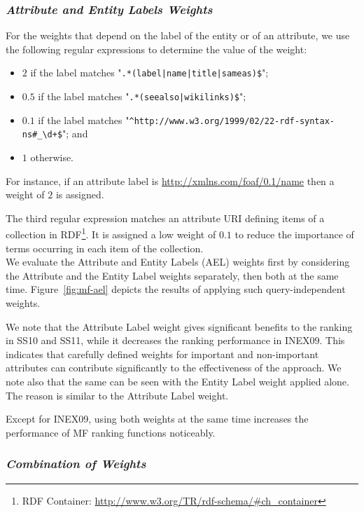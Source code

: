 \subsubsection{\emph{Attribute and Entity Labels Weights}}
\label{sec:ael-weight-effect}

For the weights that depend on the label of the entity or of an attribute, we use the following regular expressions to determine the value of the weight:
\begin{itemize}
	\item $2$ if the label matches "\verb/.*(label|name|title|sameas)$/";
	\item $0.5$ if the label matches "\verb/.*(seealso|wikilinks)$/";
	\item $0.1$ if the label matches "\verb|^http://www.w3.org/1999/02/22-rdf-syntax-ns#_\d+$|"; and
	\item $1$ otherwise.
\end{itemize}
For instance, if an attribute label is \url{http://xmlns.com/foaf/0.1/name} then a weight of $2$ is assigned.

The third regular expression matches an attribute URI defining items of a collection in RDF\footnote{RDF Container: \url{http://www.w3.org/TR/rdf-schema/\#ch\_container}}. It is assigned a low weight of $0.1$ to reduce the importance of terms occurring in each item of the collection.\\

We evaluate the Attribute and Entity Labels (AEL) weights first by considering the Attribute and the Entity Label weights separately, then both at the same time. Figure~\ref{fig:mf-ael} depicts the results of applying such query-independent weights.

We note that the Attribute Label weight gives significant benefits to the ranking in SS10 and SS11, while it decreases the ranking performance in INEX09. This indicates that carefully defined weights for important and non-important attributes can contribute significantly to the effectiveness of the approach. We note also that the same can be seen with the Entity Label weight applied alone. The reason is similar to the Attribute Label weight.

Except for INEX09, using both weights at the same time increases the performance of MF ranking functions noticeably.

\subsubsection{\emph{Combination of Weights}}
\label{sec:combi-weight-effect}

